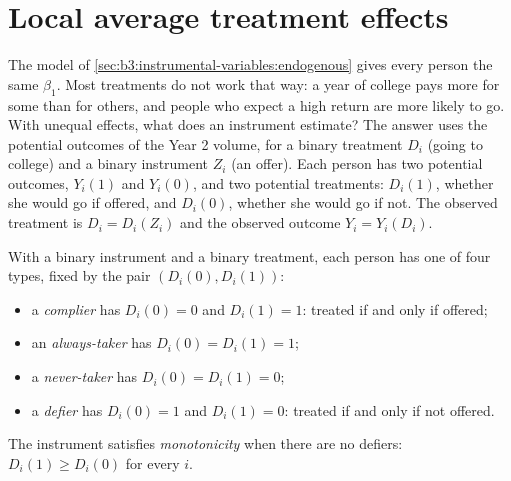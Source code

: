 \section{Local average treatment effects}\label{sec:b3:instrumental-variables:late}

The model of \cref{sec:b3:instrumental-variables:endogenous} gives every
person the same $\beta_1$. Most treatments do not work that way: a year of
college pays more for some than for others, and people who expect a high
return are more likely to go. With unequal effects, what does an instrument
estimate? The answer uses the potential outcomes of the Year 2 volume, for a
binary treatment $D_i$ (going to college) and a binary instrument $Z_i$ (an
offer). Each person has two potential outcomes, $Y_i(1)$ and $Y_i(0)$, and two
potential treatments: $D_i(1)$, whether she would go if offered, and $D_i(0)$,
whether she would go if not. The observed treatment is $D_i = D_i(Z_i)$ and the
observed outcome $Y_i = Y_i(D_i)$.

\begin{definition}\label{def:b3:instrumental-variables:compliance}
With a binary instrument and a binary treatment, each person has one of four
types, fixed by the pair $(D_i(0), D_i(1))$:
\begin{itemize}
\item a \emph{complier} has $D_i(0) = 0$ and $D_i(1) = 1$: treated if and only
if offered;
\item an \emph{always-taker} has $D_i(0) = D_i(1) = 1$;
\item a \emph{never-taker} has $D_i(0) = D_i(1) = 0$;
\item a \emph{defier} has $D_i(0) = 1$ and $D_i(1) = 0$: treated if and only
if not offered.
\end{itemize}
The instrument satisfies \emph{monotonicity} when there are no defiers:
$D_i(1) \geq D_i(0)$ for every $i$.
\end{definition}

\begin{omfigure}
\par{}
\end{omfigure}

